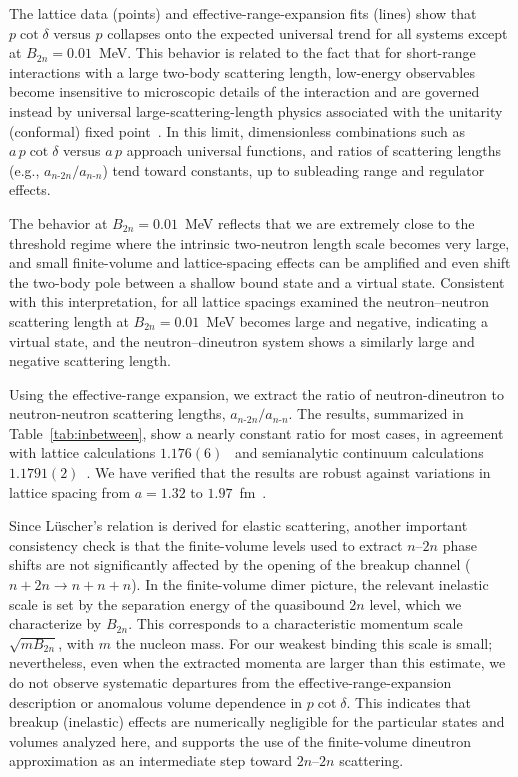\documentclass[aps,prl,showpacs,twocolumn,preprintnumbers,superscriptaddress,nofootinbib,floatfix,10pt]{revtex4-1}
\begin{document}
The lattice data (points) and effective-range-expansion fits (lines) show that $p\cot\delta$ versus $p$ collapses onto the expected universal trend for all systems except at $B_{2n}=0.01$~MeV.
This behavior is related to the fact that for short-range interactions with a large two-body scattering length,
low-energy observables become insensitive to microscopic details of the interaction and are governed
instead by universal large-scattering-length physics associated with the unitarity (conformal) fixed
point~\cite{Braaten:2004rn}. In this limit, dimensionless combinations such as $a\,p\cot\delta$ versus $a\,p$ approach
universal functions, and ratios of scattering lengths (e.g., $a_{n\text{-}2n}/a_{n\text{-}n}$) tend toward
constants, up to subleading range and regulator effects.


The behavior at $B_{2n}=0.01$~MeV reflects that we are extremely close to the
threshold regime where the intrinsic two-neutron length scale becomes very large, and small finite-volume and lattice-spacing effects can be amplified and even shift the two-body pole between a shallow bound state and a virtual state. Consistent with this interpretation,
for all lattice spacings examined the neutron--neutron scattering length at $B_{2n}=0.01$~MeV becomes
large and negative, indicating a virtual state, and the neutron--dineutron system shows a similarly large and negative scattering length.


Using the effective-range expansion, we extract the ratio of neutron-dineutron to neutron-neutron scattering lengths, $a_{n\text{-}2n}/a_{n\text{-}n}$. The results, summarized in Table~\ref{tab:inbetween}, show a nearly constant ratio for most cases,
in agreement with lattice calculations $1.176(6)$~\cite{Elhatisari:2016hui} and semianalytic continuum calculations $1.1791(2)$~\cite{
Bedaque:1997qi,Bedaque:1998mb,Gabbiani:1999yv,Bedaque:2002yg}.
We have verified that the results are robust against variations in lattice spacing from
$a=1.32$ to $1.97$~fm~\cite{SM}.


Since L\"uscher's relation is derived for elastic scattering, another important consistency check is that the finite-volume levels used to extract $n$--$2n$ phase shifts are not significantly affected by the opening of the breakup channel ($n+2n\to n+n+n$). In the finite-volume dimer picture, the relevant inelastic scale is set by the separation energy of the quasibound $2n$ level, which we characterize by $B_{2n}$. This corresponds to a characteristic momentum scale $\sqrt{mB_{2n}}$, with $m$ the nucleon mass. For our weakest binding this scale is small; nevertheless, even when the extracted momenta are larger than this estimate, we do not observe systematic departures
from the effective-range-expansion description or anomalous volume dependence in $p\cot\delta$. This indicates that breakup
(inelastic) effects are numerically negligible for the particular states and volumes analyzed here, and supports the use of
the finite-volume dineutron approximation as an intermediate step toward $2n$--$2n$ scattering.
\end{document}
